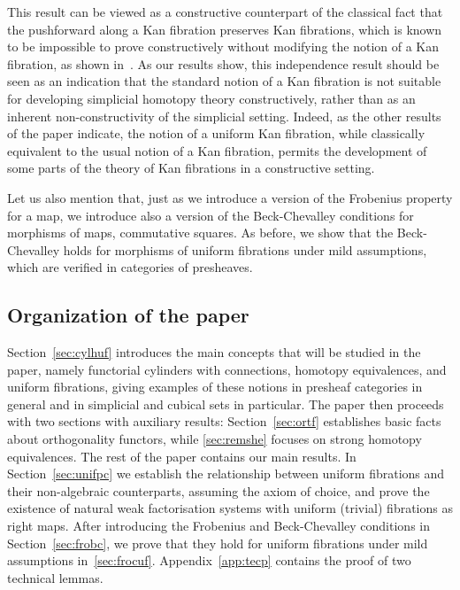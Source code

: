 \documentclass[reqno,10pt,a4paper,oneside]{amsart}
\begin{document}
This result can be viewed as a constructive counterpart of the classical fact that the pushforward along a Kan fibration preserves Kan fibrations, which is known to be impossible to prove constructively without modifying the notion of a Kan fibration, as shown in~\cite{coquand-non-constructivity-kan}.
As our results show, this independence result should be seen as an indication that the standard notion of a Kan fibration is not suitable for developing simplicial homotopy theory constructively, rather than as an inherent non-constructivity of the simplicial setting.
Indeed, as the other results of the paper indicate, the notion of a uniform Kan fibration, while classically equivalent to the usual notion of a Kan fibration, permits the development of some parts of the theory of Kan fibrations in a constructive setting.

Let us also mention that, just as we introduce a version of the Frobenius property for a map, we introduce also a version of the Beck-Chevalley conditions for morphisms of maps, \ie commutative squares.
As before, we show that the Beck-Chevalley holds for morphisms of uniform fibrations under mild assumptions, which are verified in categories of presheaves.




\subsection*{Organization of the paper} Section~\ref{sec:cylhuf} introduces the main concepts that will be studied in the paper, namely functorial cylinders with connections, homotopy equivalences, and uniform fibrations, giving examples of these notions in presheaf categories in general and in simplicial and cubical sets in particular.
The paper then proceeds with two sections with auxiliary results: Section~\ref{sec:ortf} establishes basic facts about orthogonality functors, while \cref{sec:remshe} focuses on strong homotopy equivalences.
The rest of the paper contains our main results.
In Section~\ref{sec:unifpc} we establish the relationship between uniform fibrations and their non-algebraic counterparts, assuming the axiom of choice, and prove the existence of natural weak factorisation systems with uniform (trivial) fibrations as right maps.
After introducing the Frobenius and Beck-Chevalley conditions in Section~\ref{sec:frobc}, we prove that they hold for uniform fibrations under mild assumptions in~\cref{sec:frocuf}.
Appendix~\ref{app:tecp} contains the proof of two technical lemmas.
\end{document}
